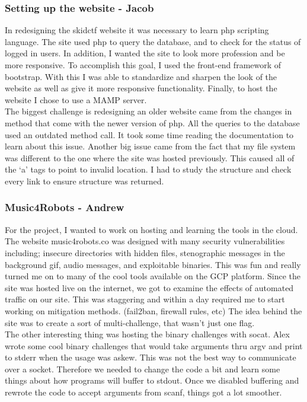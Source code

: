 \documentclass[runningheads,a4paper]{llncs}
\begin{document}
\subsubsection{Setting up the website - Jacob}
In redesigning the skidctf website it was necessary to learn php scripting language.  The site used php to query the database, and to check for the status of logged in users. In addition, I wanted the site to look more profession and be more responsive. To accomplish this goal, I used the front-end framework of bootstrap. With this I was able to standardize and sharpen the look of the website as well as give it more responsive functionality. Finally, to host the website I chose to use a MAMP server.\\
The biggest challenge is redesigning an older website came from the changes in method that come with the newer version of php. All the queries to the database used an outdated method call. It took some time reading the documentation to learn about this issue. Another big issue came from the fact that my file system was different to the one where the site was hosted previously. This caused all of the ‘a’ tags to point to invalid location. I had to study the structure and check every link to ensure structure was returned.


\subsubsection{Music4Robots - Andrew}
For the project, I wanted to work on hosting and learning the tools in the cloud. The website music4robots.co was designed with many security vulnerabilities including; insecure directories with hidden files, stenographic messages in the background gif, audio messages, and exploitable binaries. This was fun and really turned me on to many of the cool tools available on the GCP platform. Since the site was hosted live on the internet, we got to examine the effects of automated traffic on our site. This was staggering and within a day required me to start working on mitigation methods. (fail2ban, firewall rules, etc) The idea behind the site was to create a sort of multi-challenge, that wasn’t just one flag.\\
The other interesting thing was hosting the binary challenges with socat. Alex wrote some cool binary challenges that would take arguments thru argv and print to stderr when the usage was askew. This was not the best way to communicate over a socket. Therefore we needed to change the code a bit and learn some things about how programs will buffer to stdout. Once we disabled buffering and rewrote the code to accept arguments from scanf, things got a lot smoother.
\end{document}

